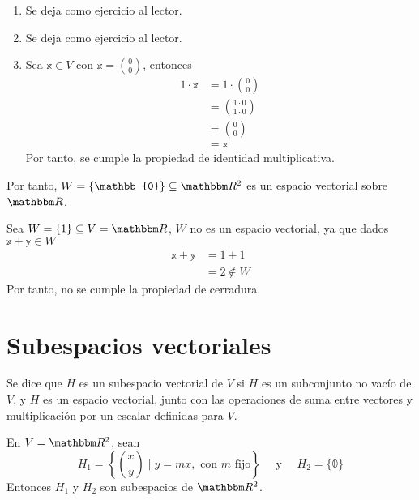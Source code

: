 \begin{example}
\begin{enumerate}[label=\roman*)]
        \item Se deja como ejercicio al lector.
        \item Se deja como ejercicio al lector.
        \item Sea $\mathbb{x} \in V$ con $\displaystyle \mathbb{x} = \binom{0}{0}$, entonces
        \begin{align*}
            1 \cdot \mathbb{x} & = 1 \cdot \binom{0}{0} \\
            & = \binom{1 \cdot 0}{1 \cdot 0} \\
            & = \binom{0}{0} \\
            & = \mathbb{x}
        \end{align*}
        Por tanto, se cumple la propiedad de identidad multiplicativa.
    \end{enumerate}
    Por tanto, $W = \{ \mathbb{0} \} \subseteq \RR[2]$ es un espacio vectorial sobre $\RR$.
\end{example}

\begin{observation}
    Sea $W = \{1\} \subseteq V = \RR$, $W$ no es un espacio vectorial, ya que dados $\mathbb{x} + \mathbb{y} \in W$
    \begin{align*}
        \mathbb{x} + \mathbb{y} & = 1 + 1 \\
        & = 2 \notin W
    \end{align*}
    Por tanto, no se cumple la propiedad de cerradura.
\end{observation}

\section{Subespacios vectoriales}

\begin{definition}
    Se dice que $H$ es un subespacio vectorial de $V$ si $H$ es un subconjunto no vacío de $V$, y $H$ es un espacio vectorial, junto con las operaciones de suma entre vectores y multiplicación por un escalar definidas para $V$.
\end{definition}

\begin{example}
    En $V = \RR[2]$, sean
    $$\displaystyle H_1 = \left\{ \binom{x}{y} \mid y = mx, \text{ con } m \text{ fijo} \right\} \quad \text{ y } \quad H_2 = \{\mathbb{0}\}$$
    Entonces $H_1$ y $H_2$ son subespacios de $\RR[2]$.
\end{example}

